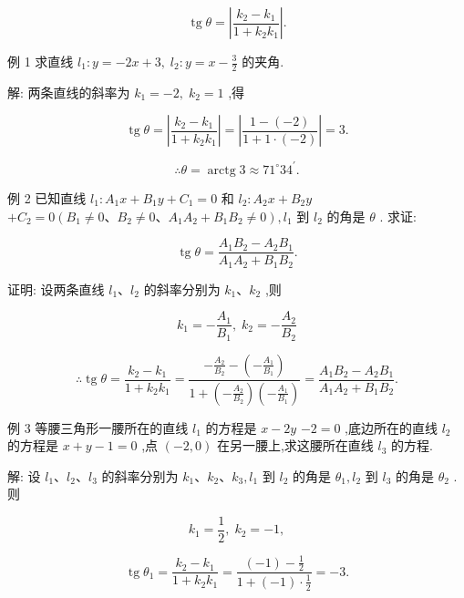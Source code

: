 \documentclass[lang=cn,newtx,10pt,scheme=chinese]{elegantbook}
\begin{document}
\[
  \operatorname{tg}\theta = \left| \frac{{k}_{2} - {k}_{1}}{1 + {k}_{2}{k}_{1}}\right| .
\]

例 1 求直线 \({l}_{1} : y = - {2x} + 3,\;{l}_{2} : y = x - \frac{3}{2}\) 的夹角.

解: 两条直线的斜率为 \({k}_{1} = - 2,\;{k}_{2} = 1\) ,得

\[
  \operatorname{tg}\theta = \left| \frac{{k}_{2} - {k}_{1}}{1 + {k}_{2}{k}_{1}}\right| = \left| \frac{1 - \left( {-2}\right) }{1 + 1 \cdot \left( {-2}\right) }\right| = 3.
\]

\[
  \therefore \theta = \operatorname{arctg}3 \approx {71}^{ \circ }{34}^{\prime }\text{.}
\]

例 2 已知直线 \({l}_{1} : {A}_{1}x + {B}_{1}y + {C}_{1} = 0\) 和 \({l}_{2} : {A}_{2}x + {B}_{2}y\) \(+ {C}_{2} = 0\left( {{B}_{1} \neq 0\text{、}{B}_{2} \neq 0\text{、}{A}_{1}{A}_{2} + {B}_{1}{B}_{2} \neq 0}\right) ,{l}_{1}\) 到 \({l}_{2}\) 的角是 \(\theta\) . 求证:

\[
  \operatorname{tg}\theta = \frac{{A}_{1}{B}_{2} - {A}_{2}{B}_{1}}{{A}_{1}{A}_{2} + {B}_{1}{B}_{2}}.
\]

证明: 设两条直线 \({l}_{1}\text{、}{l}_{2}\) 的斜率分别为 \({k}_{1}\text{、}{k}_{2}\) ,则

\[
    {k}_{1} = - \frac{{A}_{1}}{{B}_{1}},\;{k}_{2} = - \frac{{A}_{2}}{{B}_{2}}
\]

\[
  \therefore \operatorname{tg}\theta = \frac{{k}_{2} - {k}_{1}}{1 + {k}_{2}{k}_{1}} = \frac{-\frac{{A}_{2}}{{B}_{2}} - \left( {-\frac{{A}_{1}}{{B}_{1}}}\right) }{1 + \left( {-\frac{{A}_{2}}{{B}_{2}}}\right) \left( {-\frac{{A}_{1}}{{B}_{1}}}\right) } = \frac{{A}_{1}{B}_{2} - {A}_{2}{B}_{1}}{{A}_{1}{A}_{2} + {B}_{1}{B}_{2}}\text{.}
\]

例 3 等腰三角形一腰所在的直线 \({l}_{1}\) 的方程是 \(x - {2y}\) \(- 2 = 0\) ,底边所在的直线 \({l}_{2}\) 的方程是 \(x + y - 1 = 0\) ,点 \(\left( {-2,0}\right)\) 在另一腰上,求这腰所在直线 \({l}_{3}\) 的方程.

解: 设 \({l}_{1}\text{、}{l}_{2}\text{、}{l}_{3}\) 的斜率分别为 \({k}_{1}\text{、}{k}_{2}\text{、}{k}_{3},{l}_{1}\) 到 \({l}_{2}\) 的角是 \({\theta }_{1},{l}_{2}\) 到 \({l}_{3}\) 的角是 \({\theta }_{2}\) . 则

\[
    {k}_{1} = \frac{1}{2},\;{k}_{2} = - 1,
\]

\[
  \operatorname{tg}{\theta }_{1} = \frac{{k}_{2} - {k}_{1}}{1 + {k}_{2}{k}_{1}} = \frac{\left( {-1}\right) - \frac{1}{2}}{1 + \left( {-1}\right) \cdot \frac{1}{2}} = - 3.
\]
\end{document}
